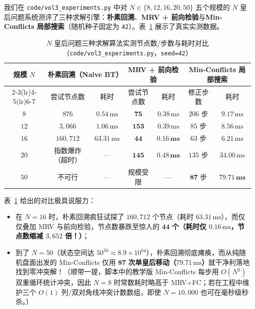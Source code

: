 我们在 \texttt{code/vol3\_experiments.py} 中对 $N \in \{8, 12, 16, 20, 50\}$ 五个规模的 $N$ 皇后问题系统测评了三种求解引擎：\textbf{朴素回溯}、\textbf{MRV + 前向检验}与\textbf{Min-Conflicts 局部搜索}（随机种子固定为 \texttt{42}）。表~\ref{tab:nqueens-exp} 展示了真实实测数据。

\begin{table}[htbp]
\centering
\caption{$N$ 皇后问题三种求解算法实测节点数/步数与耗时对比（\texttt{code/vol3\_experiments.py}，\texttt{seed=42}）}\label{tab:nqueens-exp}
\small
\begin{tabular}{@{}c|cc|cc|cc@{}}
\toprule
\multirow{2}{*}{\textbf{规模 $N$}} & \multicolumn{2}{c|}{\textbf{朴素回溯（Naive BT）}} & \multicolumn{2}{c|}{\textbf{MRV + 前向检验}} & \multicolumn{2}{c}{\textbf{Min-Conflicts 局部搜索}} \\
\cmidrule(lr){2-3}\cmidrule(lr){4-5}\cmidrule(lr){6-7}
 & 尝试节点数 & 耗时 & 尝试节点数 & 耗时 & 修正步数 & 耗时 \\
\midrule
$8$  & $876$          & $0.54\,\text{ms}$  & $\mathbf{75}$  & $0.38\,\text{ms}$ & $206$ 步 & $9.17\,\text{ms}$ \\
$12$ & $3{,}066$      & $1.06\,\text{ms}$  & $\mathbf{153}$ & $0.39\,\text{ms}$ & $85$ 步  & $8.56\,\text{ms}$ \\
$16$ & $160{,}712$    & $63.31\,\text{ms}$ & $\mathbf{44}$  & $\mathbf{0.16\,\text{ms}}$ & $63$ 步  & $6.21\,\text{ms}$ \\
$20$ & 指数爆炸（超时） & ---                & $\mathbf{145}$ & $\mathbf{0.48\,\text{ms}}$ & $135$ 步 & $34.00\,\text{ms}$ \\
$50$ & 不可行          & ---                & 规模受限       & ---               & $\mathbf{87}$ 步 & $\mathbf{79.71\,\text{ms}}$ \\
\bottomrule
\end{tabular}
\end{table}

表~\ref{tab:nqueens-exp} 给出的对比极具说服力：
\begin{itemize}
  \item 在 $N=16$ 时，朴素回溯疯狂试探了 $160{,}712$ 个节点（耗时 $63.31\,\text{ms}$），而仅仅叠加 MRV 与前向检验，节点数暴跌至惊人的 $\mathbf{44}$ \textbf{个（耗时仅 $0.16\,\text{ms}$，节点数缩减 $3{,}652$ 倍！）}；
  \item 到了 $N=50$（状态空间达 $50^{50} \approx 8.9\times 10^{84}$），朴素回溯彻底瘫痪，而从纯随机盘面出发的 Min-Conflicts 仅用 $\mathbf{87}$ \textbf{次单皇后移动（$79.71\,\text{ms}$）}就干净利落地找到零冲突解！（顺带一提，脚本中的教学版 Min-Conflicts 每步用 $O(N^2)$ 双重循环统计冲突，因此 $N=8$ 时常数耗时略高于 MRV+FC；若在工程中维护三个 $O(1)$ 列/双对角线冲突计数数组，即使 $N=10{,}000$ 也可在毫秒级秒杀。）
\end{itemize}

